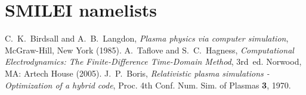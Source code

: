 \documentclass[11pt,a4paper]{article}
\begin{document}



\section*{SMILEI namelists}



\begin{thebibliography}{2}

 C.~K.~Birdsall and A.~B.~Langdon, {\it Plasma physics via computer simulation}, McGraw-Hill, New York (1985).
 A.~Taflove and S.~C.~Hagness, {\it Computational Electrodynamics: The Finite-Difference Time-Domain Method}, 3rd~ed. Norwood, MA: Artech House (2005).
 J.~P.~Boris, {\it Relativistic plasma simulations - Optimization of a hybrid code}, Proc. 4th Conf. Num. Sim. of Plasmas {\bf 3}, 1970.


\end{thebibliography}
\end{document}
